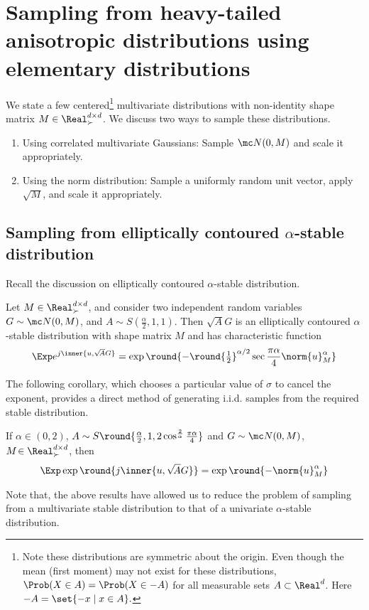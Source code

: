 \documentclass{article}
\def\cite{\citep}
\theoremstyle{plain}
\begin{document}
\section{Sampling from heavy-tailed anisotropic distributions using elementary distributions}
We state a few centered\footnote{Note these distributions are symmetric about the origin. Even though the mean (first moment) may not exist for these distributions, $\Prob(X\in A)=\Prob(X\in -A)$ for all measurable sets $A\subset \Real^d$. Here $-A=\set{-x\mid x\in A}.$} multivariate distributions with non-identity shape matrix $M\in\Real^{d\times d}_{\succ}$. We discuss two ways to sample these distributions.
\begin{enumerate}
    \item Using correlated multivariate Gaussians: Sample $\mc N(0, M)$ and scale it appropriately.
    \item Using the norm distribution: Sample a uniformly random unit vector, apply $\sqrt{M}$, and scale it appropriately.
\end{enumerate}

\subsection{Sampling from elliptically contoured \texorpdfstring{$\alpha$}{alpha}-stable distribution}

Recall the discussion on elliptically contoured $\alpha$-stable distribution.
\begin{proposition}\cite[Prop. 2.5.2]{samoradnitsky2017stable}{} 
    Let $M\in\Real^{d\times d}_\succ$, and consider two independent random variables $G \sim \mc N(0,M)$, and $A \sim S(\frac{\alpha}{2}, 1, 1)$. Then $\sqrt{\!A}G$ is an elliptically contoured $\alpha$-stable distribution with shape matrix $M$ and has characteristic function 
    \begin{align*}
        \Exp e^{j\inner{u,\sqrt{\!A}G}} = \exp\round{-\round{\tfrac{1}{2}}^{\alpha/2} \sec\frac{\pi\alpha}{4}\norm{u}_M^\alpha}
    \end{align*}
\end{proposition}
The following corollary, which chooses a particular value of $\sigma$ to cancel the exponent, provides a direct method of generating i.i.d. samples from the required stable distribution.
\begin{corollary}\label{coro:sample_stable}
    If $\alpha\in(0,2)$, $A \sim S\round{\frac{\alpha}{2}, 1, 2\cos^{\frac2\alpha}\frac{\pi\alpha}4}$ and $G\sim \mc N(0,M)$, $ M\!\in\Real^{d\times d}_{\succ}$, then 
    \begin{align*}
        \Exp \exp\round{j\inner{u,\sqrt{\!A}G}}=\exp\round{-\norm{u}_M^\alpha}
    \end{align*}
\end{corollary}
Note that, the above results have allowed us to reduce the problem of sampling from a multivariate stable distribution to that of a univariate $\alpha$-stable distribution. 
\end{document}

